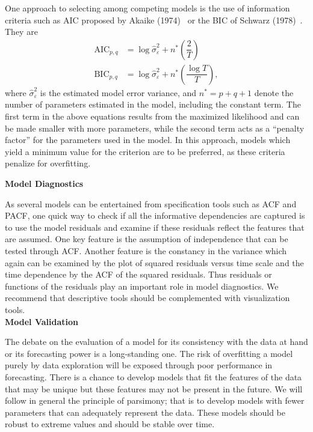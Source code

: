 One approach to selecting among competing models is the use of information criteria such as AIC proposed by Akaike (1974)~\cite{akaike74} or the BIC of Schwarz (1978)~\cite{sch78}. They are
	\begin{equation} \label{eqn:aicbic}
	\begin{aligned}
	\text{AIC}_{p,q}&= \log \hat{\sigma}_\varepsilon^2 + n^* \left( \dfrac{2}{T} \right) \\
	\text{BIC}_{p,q}&=\log\hat{\sigma}_\varepsilon^2 + n^* \left( \dfrac{\log T}{T} \right),
	\end{aligned}
	\end{equation}
where $\hat{\sigma}_\varepsilon^2$ is the estimated model error variance, and $n^*= p + q + 1$ denote the number of parameters estimated in the model, including the constant term. The first term in the above equations results from the maximized likelihood and can be made smaller with more parameters, while the second term acts as a ``penalty factor'' for the parameters used in the model. In this approach, models which yield a minimum value for the criterion are to be preferred, as these criteria penalize for overfitting. \twomedskip


{\noindent\bfseries\large Model Diagnostics} \label{in:validation2} \twomedskip


As several models can be entertained from specification tools such as ACF and PACF, one quick way to check if all the informative dependencies are captured is to use the model residuals and examine if these residuals reflect the features that are assumed. One key feature is the assumption of independence that can be tested through ACF. Another feature is the constancy in the variance which again can be examined by the plot of squared residuals versus time scale and the time dependence by the ACF of the squared residuals. Thus residuals or functions of the residuals play an important role in model diagnostics. We recommend that descriptive tools should be complemented with visualization tools. \\


{\noindent\bfseries\large Model Validation} \twomedskip


The debate on the evaluation of a model for its consistency with the data at hand or its forecasting power is a long-standing one. The risk of overfitting a model purely by data exploration will be exposed through poor performance in forecasting. There is a chance to develop models that fit the features of the data that may be unique but these features may not be present in the future. We will follow in general the principle of parsimony; that is to develop models with fewer parameters that can adequately represent the data. These models should be robust to extreme values and should be stable over time.


